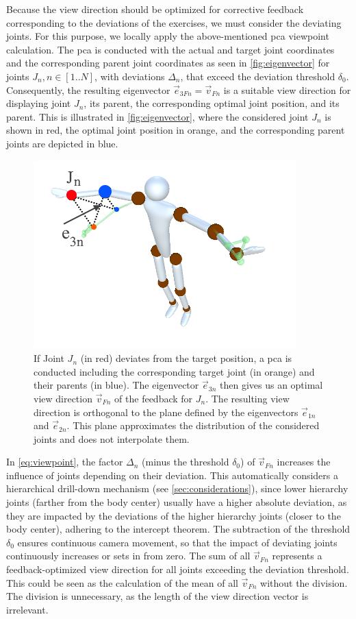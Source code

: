 Because the view direction should be optimized for corrective feedback corresponding to the deviations of the exercises, we must consider the deviating joints. For this purpose, we locally apply the above-mentioned \acrshort{pca} viewpoint calculation. The \acrshort{pca} is conducted with the actual and target joint coordinates and the corresponding parent joint coordinates as seen in \autoref{fig:eigenvector} for joints \(J_n, n \in [1..N]\), with deviations \(\Delta_n\), that exceed the deviation threshold \(\delta_0\). Consequently, the resulting eigenvector \(\vec{e}_{3Fn} = \vec{v}_{Fn}\) is a suitable view direction for displaying joint \(J_n\), its parent, the corresponding optimal joint position, and its parent. This is illustrated in \autoref{fig:eigenvector}, where the considered joint \(J_n\) is shown in red, the optimal joint position in orange, and the corresponding parent joints are depicted in blue.

\begin{figure}[tb]
	\centering
	\includegraphics[width=0.5\linewidth]{pictures/eigenvector.png}
	\caption[PCA provides an optimal view direction for feedback.]{If Joint \(J_n\) (in red) deviates from the target position, a \acrshort{pca} is conducted including the corresponding target joint (in orange) and their parents (in blue). The eigenvector \(\vec{e}_{3n}\) then gives us an optimal view direction \(\vec{v}_{Fn}\) of the feedback for \(J_n\). The resulting view direction is orthogonal to the plane defined by the eigenvectors \(\vec{e}_{1n}\) and \(\vec{e}_{2n}\). This plane approximates the distribution of the considered joints and does not interpolate them.}
	\label{fig:eigenvector}
\end{figure}

In \autoref{eq:viewpoint}, the factor \(\Delta_n\) (minus the threshold \(\delta_0\)) of \(\vec{v}_{Fn}\) increases the influence of joints depending on their deviation. This automatically considers a hierarchical drill-down mechanism (see \autoref{sec:considerations}), since lower hierarchy joints (farther from the body center) usually have a higher absolute deviation, as they are impacted by the deviations of the higher hierarchy joints (closer to the body center), adhering to the intercept theorem. The subtraction of the threshold \(\delta_0\) ensures continuous camera movement, so that the impact of deviating joints continuously increases or sets in from zero. The sum of all \(\vec{v}_{Fn}\) represents a feedback-optimized view direction for all joints exceeding the deviation threshold. This could be seen as the calculation of the mean of all \(\vec{v}_{Fn}\) without the division. The division is unnecessary, as the length of the view direction vector is irrelevant.

